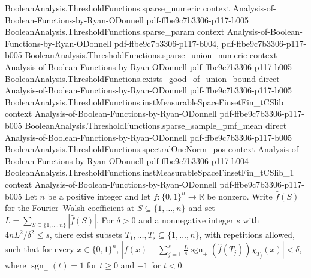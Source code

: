 \begin{theorem}
\proofstep
  {BooleanAnalysis.ThresholdFunctions.sparse_numeric}
  {context}
  {Analysis-of-Boolean-Functions-by-Ryan-ODonnell}
  {pdf-ffbe9c7b3306-p117-b005}
\proofstep
  {BooleanAnalysis.ThresholdFunctions.sparse_param}
  {context}
  {Analysis-of-Boolean-Functions-by-Ryan-ODonnell}
  {pdf-ffbe9c7b3306-p117-b004,
    pdf-ffbe9c7b3306-p117-b005}
\proofstep
  {BooleanAnalysis.ThresholdFunctions.sparse_union_numeric}
  {context}
  {Analysis-of-Boolean-Functions-by-Ryan-ODonnell}
  {pdf-ffbe9c7b3306-p117-b005}
\proofstep
  {BooleanAnalysis.ThresholdFunctions.exists_good_of_union_bound}
  {direct}
  {Analysis-of-Boolean-Functions-by-Ryan-ODonnell}
  {pdf-ffbe9c7b3306-p117-b005}
\proofstep
  {BooleanAnalysis.ThresholdFunctions.instMeasurableSpaceFinsetFin_tCSlib}
  {context}
  {Analysis-of-Boolean-Functions-by-Ryan-ODonnell}
  {pdf-ffbe9c7b3306-p117-b005}
\proofstep
  {BooleanAnalysis.ThresholdFunctions.sparse_sample_pmf_mean}
  {direct}
  {Analysis-of-Boolean-Functions-by-Ryan-ODonnell}
  {pdf-ffbe9c7b3306-p117-b005}
\proofstep
  {BooleanAnalysis.ThresholdFunctions.spectralOneNorm_pos}
  {context}
  {Analysis-of-Boolean-Functions-by-Ryan-ODonnell}
  {pdf-ffbe9c7b3306-p117-b004}
\proofstep
  {BooleanAnalysis.ThresholdFunctions.instMeasurableSpaceFinsetFin_tCSlib_1}
  {context}
  {Analysis-of-Boolean-Functions-by-Ryan-ODonnell}
  {pdf-ffbe9c7b3306-p117-b005}
Let $n$ be a positive integer and let $f:\{0,1\}^n\to\mathbb R$ be nonzero. Write
$\widehat f(S)$ for the Fourier–Walsh coefficient at $S\subseteq\{1,\ldots,n\}$ and set
$L=\sum_{S\subseteq\{1,\ldots,n\}}|\widehat f(S)|$. For $\delta>0$ and a nonnegative
integer $s$ with $4nL^2/\delta^2\le s$, there exist subsets
$T_1,\ldots,T_s\subseteq\{1,\ldots,n\}$, with repetitions allowed, such that for every
$x\in\{0,1\}^n$, $\left|f(x)-\sum_{j=1}^s \frac{L}{s}\operatorname{sgn}_+(\widehat
f(T_j))\chi_{T_j}(x)\right|<\delta$, where $\operatorname{sgn}_+(t)=1$ for $t\ge0$ and
$-1$ for $t<0$.
\end{theorem}
